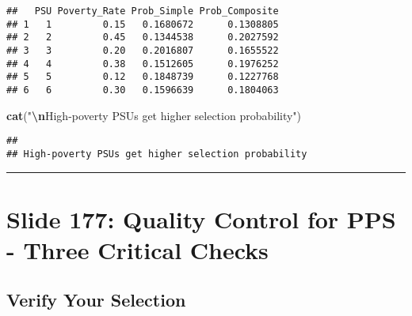 \documentclass[
]{article}
\newenvironment{Shaded}{\begin{snugshade}}{\end{snugshade}}
\newcommand{\FunctionTok}[1]{\textcolor[rgb]{0.13,0.29,0.53}{\textbf{#1}}}
\newcommand{\NormalTok}[1]{#1}
\newcommand{\SpecialCharTok}[1]{\textcolor[rgb]{0.81,0.36,0.00}{\textbf{#1}}}
\newcommand{\StringTok}[1]{\textcolor[rgb]{0.31,0.60,0.02}{#1}}
\begin{document}
\begin{verbatim}
##   PSU Poverty_Rate Prob_Simple Prob_Composite
## 1   1         0.15   0.1680672      0.1308805
## 2   2         0.45   0.1344538      0.2027592
## 3   3         0.20   0.2016807      0.1655522
## 4   4         0.38   0.1512605      0.1976252
## 5   5         0.12   0.1848739      0.1227768
## 6   6         0.30   0.1596639      0.1804063
\end{verbatim}

\begin{Shaded}
\begin{Highlighting}[]
\FunctionTok{cat}\NormalTok{(}\StringTok{"}\SpecialCharTok{\textbackslash{}n}\StringTok{High{-}poverty PSUs get higher selection probability"}\NormalTok{)}
\end{Highlighting}
\end{Shaded}

\begin{verbatim}
## 
## High-poverty PSUs get higher selection probability
\end{verbatim}

\begin{center}\rule{0.5\linewidth}{0.5pt}\end{center}

\section{Slide 177: Quality Control for PPS - Three Critical
Checks}\label{slide-177-quality-control-for-pps---three-critical-checks}

\subsection{Verify Your Selection}\label{verify-your-selection}
\end{document}
